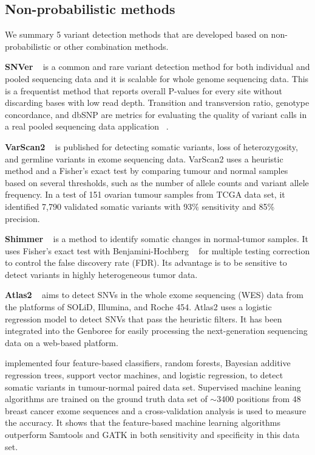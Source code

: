 \documentclass[11pt,reqno]{amsart}
\begin{document}
\subsection{Non-probabilistic methods}

We summary 5 variant detection methods that are developed based on non-probabilistic or other combination methods.

\textbf{SNVer} ~\citep{Wei2011} is a common and rare variant detection method for both individual and pooled sequencing data and it is scalable for whole genome sequencing data.
This is a frequentist method that reports overall P-values for every site without discarding bases with low read depth.
Transition and transversion ratio, genotype concordance, and dbSNP are metrics for evaluating the quality of variant calls in a real pooled sequencing data application ~\citep{depristo2011framework}.

\textbf{VarScan2} ~\citep{Koboldt2012} is published for detecting somatic variants, loss of heterozygosity, and germline variants in exome sequencing data.
VarScan2 uses a heuristic method and a Fisher's exact test by comparing tumour and normal samples based on several thresholds, such as the number of allele counts and variant allele frequency.
In a test of 151 ovarian tumour samples from TCGA data set, it identified 7,790 validated somatic variants with 93\% sensitivity and 85\% precision.

\textbf{Shimmer} ~\citep{Hansen2013} is a method to identify somatic changes in normal-tumor samples.
It uses Fisher's exact test with Benjamini-Hochberg ~\citep{benjamini1995controlling} for multiple testing correction to control the false discovery rate (FDR).
Its advantage is to be sensitive to detect variants in highly heterogeneous tumor data.

\textbf{Atlas2} ~\citep{challis2012integrative} aims to detect SNVs in the whole exome sequencing (WES) data from the platforms of SOLiD, Illumina, and Roche 454.
Atlas2 uses a logistic regression model to detect SNVs that pass the heuristic filters.
It has been integrated into the Genboree for easily processing the next-generation sequencing data on a web-based platform.


\citet{Ding2012} implemented four feature-based classifiers, random forests, Bayesian additive regression trees, support vector machines, and logistic regression, to detect somatic variants in tumour-normal paired data set.
Supervised machine leaning algorithms are trained on the ground truth data set of $\sim 3400$ positions from $48$ breast cancer exome sequences and a cross-validation analysis is used to measure the accuracy.
It shows that the feature-based machine learning algorithms outperform Samtools and GATK in both sensitivity and specificity in this data set.
\end{document}
